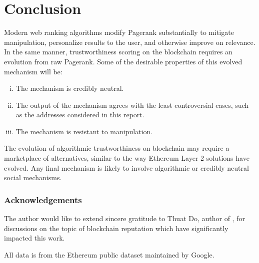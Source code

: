 \documentclass[a4paper]{article}
\begin{document}
\section{Conclusion}

 Modern web ranking algorithms modify Pagerank substantially to mitigate manipulation, personalize results to the user, and otherwise improve on relevance.  In the same manner, trustworthiness scoring on the blockchain requires an evolution from raw Pagerank. Some of the desirable properties of this evolved mechanism will be:
 \begin{enumerate}[i.]
 \item The mechanism is credibly neutral.
 \item The output of the mechanism agrees with the least controversial cases, such as the addresses considered in this report.
 \item The mechanism is resistant to manipulation.
 \end{enumerate}
The evolution of algorithmic trustworthiness on blockchain may require a marketplace of alternatives, similar to the way Ethereum Layer 2 solutions have evolved.  Any final mechanism is likely to involve algorithmic or credibly neutral social mechanisms.

\subsubsection{Acknowledgements}

The author would like to extend sincere gratitude to Thuat Do, author of \cite{Paven2}, for  discussions on the topic of blockchain reputation which have significantly impacted this work.  

All data is from the Ethereum public dataset maintained by Google.

%
\end{document}
